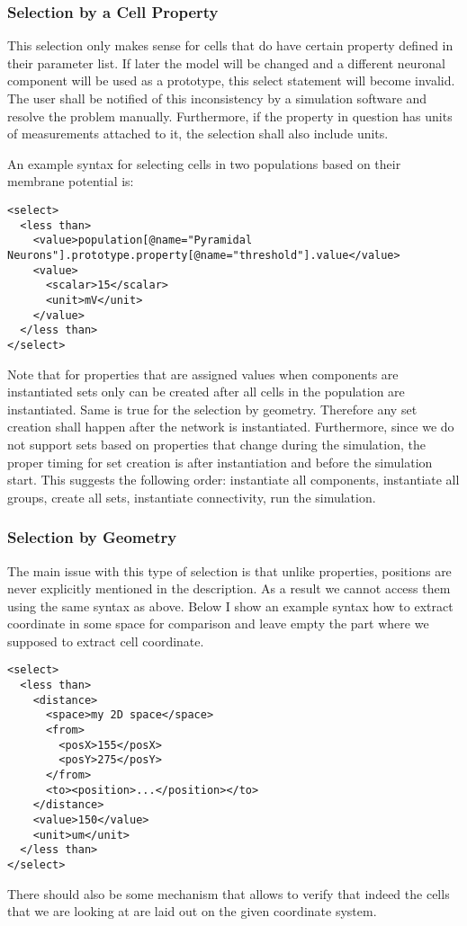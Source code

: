 \documentclass{article}
\begin{document}
\subsubsection{Selection by a Cell Property}

This selection only makes sense for cells that do have certain property
defined in their parameter list. If later the model will be changed and a different
neuronal component will be used as a prototype, this select statement will become
invalid. The user shall be notified of this inconsistency by a simulation software
and resolve the problem manually. Furthermore, if the property in question has
units of measurements attached to it, the selection shall also include units.

An example syntax for selecting cells in two populations based on their
membrane potential is:
\begin{verbatim}
<select>
  <less than>
    <value>population[@name="Pyramidal Neurons"].prototype.property[@name="threshold"].value</value>
    <value>
      <scalar>15</scalar>
      <unit>mV</unit>
    </value>
  </less than>
</select>
\end{verbatim}

Note that for properties that are assigned values when components are instantiated
sets only can be created after all cells in the population are instantiated.
Same is true for the selection by geometry. Therefore any set creation shall
happen after the network is instantiated. Furthermore, since we do not support
sets based on properties that change during the simulation, the proper timing
for set creation is after instantiation and before the simulation start.
This suggests the following order: instantiate all components, instantiate all
groups, create all sets, instantiate connectivity, run the simulation.

\subsubsection{Selection by Geometry}

The main issue with this type of selection is that unlike properties, positions
are never explicitly mentioned in the description. As a result we cannot access
them using the same syntax as above. Below I show an example syntax how to
extract coordinate in some space for comparison and leave empty the part where we
supposed to extract cell coordinate.

\begin{verbatim}
<select>
  <less than>
    <distance>
      <space>my 2D space</space>
      <from>
        <posX>155</posX>
        <posY>275</posY>
      </from>
      <to><position>...</position></to>
    </distance>
    <value>150</value>
    <unit>um</unit>
  </less than>
</select>
\end{verbatim}
There should also be some mechanism that allows to verify that indeed the cells
that we are looking at are laid out on the given coordinate system.
\end{document}
